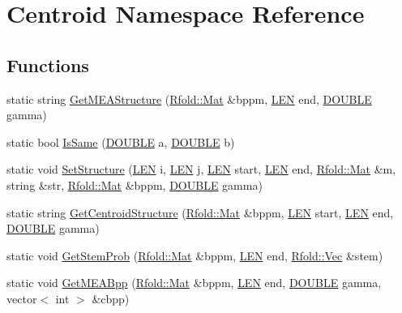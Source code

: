 \hypertarget{namespace_centroid}{\section{Centroid Namespace Reference}
\label{namespace_centroid}
}
\subsection*{Functions}
\begin{DoxyCompactItemize}
\item 
static string \hyperlink{namespace_centroid_a2472e4e4f8b057695c4dc82a1296a750}{Get\+M\+E\+A\+Structure} (\hyperlink{namespace_rfold_a6392dbfbc164230455fdcdb1a0ff53d7}{Rfold\+::\+Mat} \&bppm, \hyperlink{energy__const_8hh_a05b49c662c073f89e86804f7856622a0}{L\+E\+N} end, \hyperlink{energy__const_8hh_a8747af38b86aa2bbcda2f1b1aa0888c2}{D\+O\+U\+B\+L\+E} gamma)
\item 
static bool \hyperlink{namespace_centroid_a1a72933cf1eb8e2db11025b2596a01a4}{Is\+Same} (\hyperlink{energy__const_8hh_a8747af38b86aa2bbcda2f1b1aa0888c2}{D\+O\+U\+B\+L\+E} a, \hyperlink{energy__const_8hh_a8747af38b86aa2bbcda2f1b1aa0888c2}{D\+O\+U\+B\+L\+E} b)
\item 
static void \hyperlink{namespace_centroid_a23c4bcb9b477ed0b23bda10a19cf8794}{Set\+Structure} (\hyperlink{energy__const_8hh_a05b49c662c073f89e86804f7856622a0}{L\+E\+N} i, \hyperlink{energy__const_8hh_a05b49c662c073f89e86804f7856622a0}{L\+E\+N} j, \hyperlink{energy__const_8hh_a05b49c662c073f89e86804f7856622a0}{L\+E\+N} start, \hyperlink{energy__const_8hh_a05b49c662c073f89e86804f7856622a0}{L\+E\+N} end, \hyperlink{namespace_rfold_a6392dbfbc164230455fdcdb1a0ff53d7}{Rfold\+::\+Mat} \&m, string \&str, \hyperlink{namespace_rfold_a6392dbfbc164230455fdcdb1a0ff53d7}{Rfold\+::\+Mat} \&bppm, \hyperlink{energy__const_8hh_a8747af38b86aa2bbcda2f1b1aa0888c2}{D\+O\+U\+B\+L\+E} gamma)
\item 
static string \hyperlink{namespace_centroid_a8acbc5a0352efc745aa7463bc0072314}{Get\+Centroid\+Structure} (\hyperlink{namespace_rfold_a6392dbfbc164230455fdcdb1a0ff53d7}{Rfold\+::\+Mat} \&bppm, \hyperlink{energy__const_8hh_a05b49c662c073f89e86804f7856622a0}{L\+E\+N} start, \hyperlink{energy__const_8hh_a05b49c662c073f89e86804f7856622a0}{L\+E\+N} end, \hyperlink{energy__const_8hh_a8747af38b86aa2bbcda2f1b1aa0888c2}{D\+O\+U\+B\+L\+E} gamma)
\item 
static void \hyperlink{namespace_centroid_a1536a120dbc969d6a6702ae758427555}{Get\+Stem\+Prob} (\hyperlink{namespace_rfold_a6392dbfbc164230455fdcdb1a0ff53d7}{Rfold\+::\+Mat} \&bppm, \hyperlink{energy__const_8hh_a05b49c662c073f89e86804f7856622a0}{L\+E\+N} end, \hyperlink{namespace_rfold_aaf02f2c0c40c1dd572dbdd8bc1bde67d}{Rfold\+::\+Vec} \&stem)
\item 
static void \hyperlink{namespace_centroid_a4bed069b4230a7f988bf8ed45b96a605}{Get\+M\+E\+A\+Bpp} (\hyperlink{namespace_rfold_a6392dbfbc164230455fdcdb1a0ff53d7}{Rfold\+::\+Mat} \&bppm, \hyperlink{energy__const_8hh_a05b49c662c073f89e86804f7856622a0}{L\+E\+N} end, \hyperlink{energy__const_8hh_a8747af38b86aa2bbcda2f1b1aa0888c2}{D\+O\+U\+B\+L\+E} gamma, vector$<$ int $>$ \&cbpp)
\end{DoxyCompactItemize}


